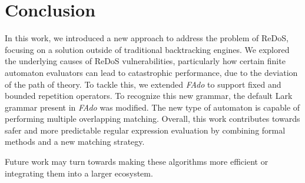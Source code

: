 \chapter{Conclusion}
In this work, we introduced a new approach to address the problem of \ac{ReDoS}, focusing on a solution outside of traditional backtracking engines.
We explored the underlying causes of ReDoS vulnerabilities, particularly how certain finite automaton evaluators can lead to catastrophic performance, due to the deviation of the path of theory. To tackle this, we extended \textit{FAdo} to support fixed and bounded repetition operators. To recognize this new grammar, the default Lark grammar present in \textit{FAdo} was modified. The new type of automaton is capable of performing multiple overlapping matching.
Overall, this work contributes towards safer and more predictable regular expression evaluation by combining formal methods and a new matching strategy.

Future work may turn towards making these algorithms more efficient or integrating them into a larger ecosystem.

